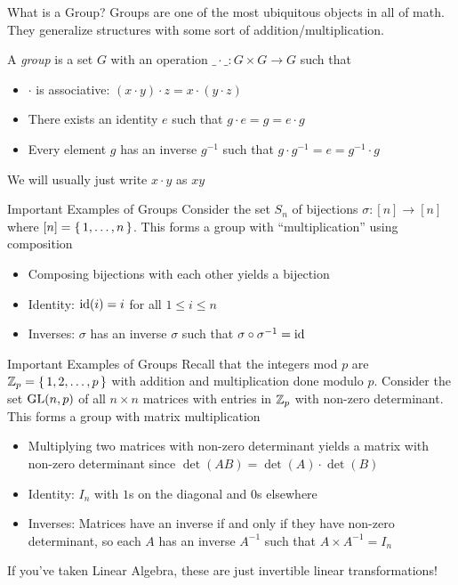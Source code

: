 \documentclass[aspectratio=169]{beamer}
\begin{document}
\begin{frame}{What is a Group?}
    Groups are one of the most ubiquitous objects in all of math. They generalize structures with some sort of addition/multiplication. \pause

    \begin{defn}
        A \emph{group} is a set $G$ with an operation $\_ \cdot \_ \colon G \times G \to G$ such that
        \begin{itemize}
            \item $\cdot$ is associative: $(x \cdot y) \cdot z = x \cdot (y \cdot z)$ \pause
            \item There exists an identity $e$ such that $g \cdot e = g = e \cdot g$ \pause
            \item Every element $g$ has an inverse $g^{-1}$ such that $g \cdot g^{-1} = e = g^{-1} \cdot g$
        \end{itemize}
    We will usually just write $x \cdot y$ as $xy$
        
    \end{defn}
\end{frame}

\begin{frame}{Important Examples of Groups}
    Consider the set $S_n$ of bijections $\sigma\colon [n] \to [n]$ where $[n] = \set{1, \ldots, n}$. 
    This forms a group with ``multiplication'' using composition\pause
    \begin{itemize}
        \item Composing bijections with each other yields a bijection
        \item Identity: \pause $\operatorname{id}(i) = i$ for all $1 \leq i \leq n$ \pause
        \item Inverses: \pause $\sigma$ has an inverse $\sigma$ such that $\sigma \circ \sigma^{-1} = \operatorname{id}$
    \end{itemize}
\end{frame}

\begin{frame}{Important Examples of Groups}
    Recall that the integers mod $p$ are $ \mathbb{Z}_{p} = \set{1, 2, \ldots, p}$ with addition and multiplication done modulo $p$.
    Consider the set $\operatorname{GL}(n, p)$ of all $n \times n$ matrices with entries in $\mathbb{Z}_p$ with non-zero determinant. 
    This forms a group with matrix multiplication \pause
    \begin{itemize}
        \item Multiplying two matrices with non-zero determinant yields a matrix with non-zero determinant since $\det(AB) = \det(A) \cdot \det(B)$
        \item Identity: \pause $I_n$ with $1$s on the diagonal and $0$s elsewhere
        \item Inverses: \pause Matrices have an inverse if and only if they have non-zero determinant, so each $A$ has an inverse $A^{-1}$ such that $A \times A^{-1} = I_n$
    \end{itemize}
    If you've taken Linear Algebra, these are just invertible linear transformations!
\end{frame}
\end{document}
